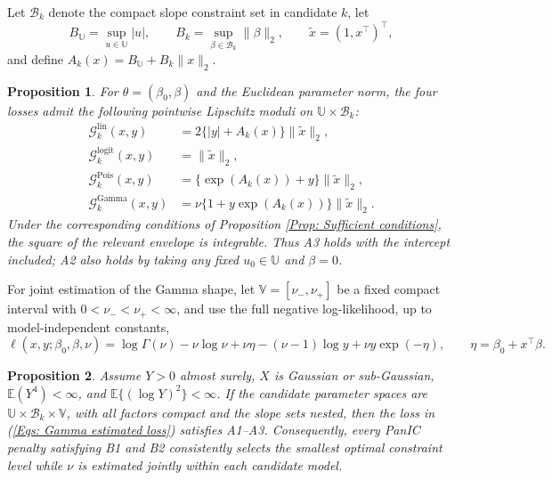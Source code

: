 \documentclass[12pt]{article}
\newenvironment{bluechange}{\begingroup\color[rgb]{0.00,0.00,1.00}}{\endgroup}
\newtheorem{proposition}{Proposition}
\theoremstyle{remark}
\theoremstyle{plain}
\begin{document}
\begin{bluechange}
Let $\mathcal B_k$ denote the compact slope constraint set in candidate $k$, let
\[
B_{\mathbb{U}}=\sup_{u\in\mathbb{U}}|u|,
\qquad B_k=\sup_{\beta\in\mathcal B_k}\|\beta\|_2,
\qquad \widetilde x=(1,x^\top)^\top,
\]
and define $A_k(x)=B_{\mathbb{U}}+B_k\|x\|_2$.

\begin{proposition}\label{Prop: intercept envelopes}
For $\theta=(\beta_0,\beta)$ and the Euclidean parameter norm, the four losses admit the following pointwise Lipschitz moduli on $\mathbb{U}\times\mathcal B_k$:
\begin{align*}
\mathcal G_k^{\mathrm{lin}}(x,y)&=2\{|y|+A_k(x)\}\|\widetilde x\|_2,\\
\mathcal G_k^{\mathrm{logit}}(x,y)&=\|\widetilde x\|_2,\\
\mathcal G_k^{\mathrm{Pois}}(x,y)&=\{\exp(A_k(x))+y\}\|\widetilde x\|_2,\\
\mathcal G_k^{\mathrm{Gamma}}(x,y)&=\nu\{1+y\exp(A_k(x))\}\|\widetilde x\|_2.
\end{align*}
Under the corresponding conditions of Proposition \ref{Prop: Sufficient conditions}, the square of the relevant envelope is integrable. Thus A3 holds with the intercept included; A2 also holds by taking any fixed $u_0\in\mathbb{U}$ and $\beta=0$.
\end{proposition}

For joint estimation of the Gamma shape, let $\mathbb{V}=[\nu_-,\nu_+]$ be a fixed compact interval with $0<\nu_-<\nu_+<\infty$, and use the full negative log-likelihood, up to model-independent constants,
\begin{equation}\label{Eqs: Gamma estimated loss}
\ell(x,y;\beta_0,\beta,\nu)
=\log\Gamma(\nu)-\nu\log\nu+\nu\eta-(\nu-1)\log y+\nu y\exp(-\eta),
\qquad \eta=\beta_0+x^\top\beta.
\end{equation}
\begin{proposition}\label{Prop: estimated Gamma shape}
Assume $Y>0$ almost surely, $X$ is Gaussian or sub-Gaussian, $\mathbb E(Y^4)<\infty$, and $\mathbb E\{(\log Y)^2\}<\infty$. If the candidate parameter spaces are $\mathbb{U}\times\mathcal B_k\times\mathbb{V}$, with all factors compact and the slope sets nested, then the loss in (\ref{Eqs: Gamma estimated loss}) satisfies A1--A3. Consequently, every PanIC penalty satisfying B1 and B2 consistently selects the smallest optimal constraint level while $\nu$ is estimated jointly within each candidate model.
\end{proposition}
\end{bluechange}
\end{document}
